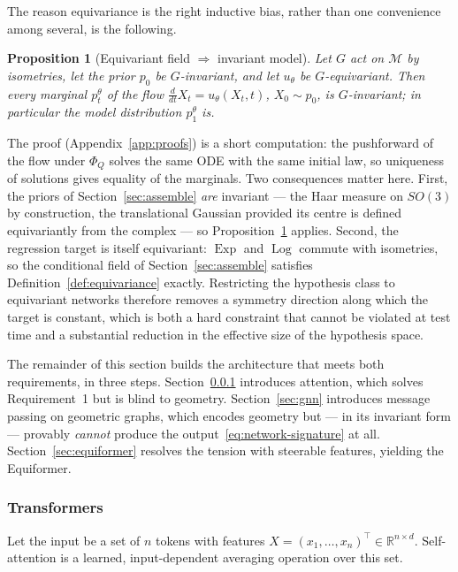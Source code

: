 \documentclass[a4paper,12pt]{article}
\newtheorem{proposition}[theorem]{Proposition}
\theoremstyle{remark}
\DeclareMathOperator{\Exp}{Exp}
\DeclareMathOperator{\Log}{Log}
\begin{document}
The reason equivariance is the right inductive bias, rather than one convenience among
several, is the following.

\begin{proposition}[Equivariant field $\Rightarrow$ invariant model]
\label{prop:equivariant-invariant}
Let $G$ act on $\mathcal M$ by isometries, let the prior $p_0$ be $G$-invariant, and let
$u_\theta$ be $G$-equivariant. Then every marginal $p_t^\theta$ of the flow
$\tfrac{d}{dt}X_t=u_\theta(X_t,t)$, $X_0\sim p_0$, is $G$-invariant; in particular the
model distribution $p_1^\theta$ is.
\end{proposition}

The proof (Appendix~\ref{app:proofs}) is a short computation: the pushforward of the flow
under $\Phi_Q$ solves the same ODE with the same initial law, so uniqueness of solutions
gives equality of the marginals. Two consequences matter here. First, the priors of
Section~\ref{sec:assemble} \emph{are} invariant --- the Haar measure on $SO(3)$ by
construction, the translational Gaussian provided its centre is defined equivariantly
from the complex --- so Proposition~\ref{prop:equivariant-invariant} applies. Second, the
regression target is itself equivariant: $\Exp$ and $\Log$ commute with isometries, so
the conditional field of Section~\ref{sec:assemble} satisfies
Definition~\ref{def:equivariance} exactly. Restricting the hypothesis class to
equivariant networks therefore removes a symmetry direction along which the target is
constant, which is both a hard constraint that cannot be violated at test time and a
substantial reduction in the effective size of the hypothesis space.

The remainder of this section builds the architecture that meets both requirements, in
three steps. Section~\ref{sec:transformer} introduces attention, which solves
Requirement~1 but is blind to geometry. Section~\ref{sec:gnn} introduces message
passing on geometric graphs, which encodes geometry but --- in its invariant form ---
provably \emph{cannot} produce the output~\eqref{eq:network-signature} at all.
Section~\ref{sec:equiformer} resolves the tension with steerable features, yielding the
Equiformer.

\subsubsection{Transformers}
\label{sec:transformer}

Let the input be a set of $n$ tokens with features $X=(x_1,\dots,x_n)^\top\in\mathbb R^{n\times d}$.
Self-attention is a learned, input-dependent averaging operation over this set.
\end{document}
